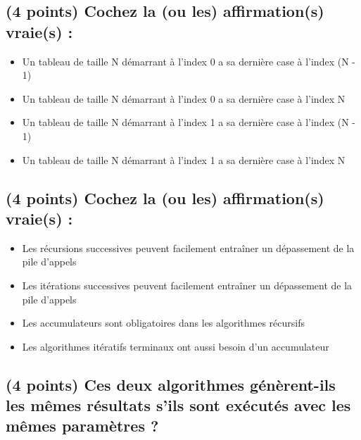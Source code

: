 \documentclass[11pt,a4paper]{article}
\begin{document}
\bigskip


\subsection{(4 points) Cochez la (ou les) affirmation(s) vraie(s) : }

\begin{itemize}
  \item[\CaseCoche] Un tableau de taille N démarrant à l'index 0 a sa dernière case à l'index (N - 1) \\
  \item[\CaseCoche] Un tableau de taille N démarrant à l'index 0 a sa dernière case à l'index N \\
  \item[\CaseCoche] Un tableau de taille N démarrant à l'index 1 a sa dernière case à l'index (N - 1) \\
  \item[\CaseCoche] Un tableau de taille N démarrant à l'index 1 a sa dernière case à l'index N \\
\end{itemize}


\bigskip


\subsection{(4 points) Cochez la (ou les) affirmation(s) vraie(s) : }

\begin{itemize}
  \item[\CaseCoche] Les récursions successives peuvent facilement entraîner un dépassement de la pile d'appels \\
  \item[\CaseCoche] Les itérations successives peuvent facilement entraîner un dépassement de la pile d'appels \\
  \item[\CaseCoche] Les accumulateurs sont obligatoires dans les algorithmes récursifs \\
  \item[\CaseCoche] Les algorithmes itératifs terminaux ont aussi besoin d'un accumulateur \\
\end{itemize}


\newpage

\subsection{(4 points) Ces deux algorithmes génèrent-ils les mêmes résultats s'ils sont exécutés avec les mêmes paramètres ? }
\end{document}
